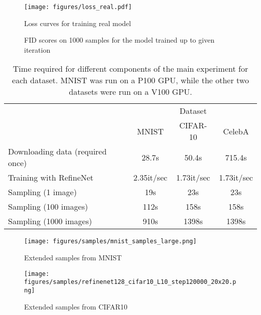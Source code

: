 \documentclass{article}
\begin{document}
\newpage


\begin{figure}[h!]
    \centering
    \texttt{[image: figures/loss\_real.pdf]}
    \caption{Loss curves for training real model}
    \label{fig:losses}
\end{figure}


\begin{figure}[h!]
    \centering
    \caption{FID scores on 1000 samples for the model trained up to given iteration}
    \label{fig:fid}
\end{figure}

\vspace{1cm}

\begin{table}[h!]
    \centering
    \begin{tabular}{l c c c}
    \toprule
         & \multicolumn{3}{c}{Dataset} \\ \cmidrule{2-4}
         & MNIST & CIFAR-10 & CelebA \\ \midrule     
    Downloading data (required once) & 28.7s & 50.4s & 715.4s \\
    Training with RefineNet & 2.35it/sec & 1.73it/sec & 1.73it/sec \\
    Sampling (1 image) & 19s & 23s & 23s \\
    Sampling (100 images) & 112s & 158s & 158s \\
    Sampling (1000 images) & 910s & 1398s & 1398s \\ \bottomrule
    \end{tabular}
    \caption{Time required for different components of the main experiment for each dataset. MNIST was run on a P100 GPU, while the other two datasets were run on a V100 GPU.}
    \label{tab:times}
\end{table}


\begin{figure}[h!]
    \centering
    \texttt{[image: figures/samples/mnist\_samples\_large.png]}
    \caption{Extended samples from MNIST}
    \label{fig:mnist-samples-large}
\end{figure}

\begin{figure}[h!]
    \centering
    \texttt{[image: figures/samples/refinenet128\_cifar10\_L10\_step120000\_20x20.png]}
    \caption{Extended samples from CIFAR10}
    \label{fig:cifar10-samples-large}
\end{figure}
\end{document}
